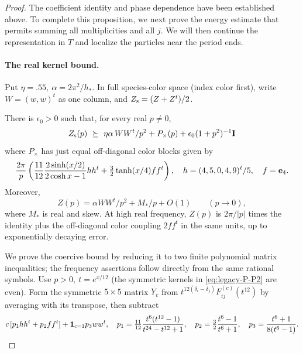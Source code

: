 \begin{proof}
The coefficient identity and phase dependence have been established
above. To complete this proposition, we next prove the energy estimate
that permits summing all multiplicities and all \(j\). We will then
continue the representation in \(T\) and localize the particles near
the period ends.

\paragraph{The real kernel bound.}
Put \(\eta=.55,\ \alpha=2\pi^2/h_*\). In full species-color space
(index color first), write \(W=(w,w)^t\) as one column, and
\(Z_{\rm s}=(Z+Z^t)/2\).

\begin{auxlemma}
There is \(\epsilon_0>0\) such that, for every real \(p\ne0\),
\begin{equation}
 Z_{\rm s}(p)\ \succeq\ \eta\alpha\, WW^t/p^2 + P_{\times}(p) + \epsilon_0(1+p^2)^{-1}{\bf I}
 \label{eq:legacy-P-P2}
\end{equation}
where \(P_{\times}\) has just equal off-diagonal color blocks given by
\[
 \frac{2\pi}{p}\left(\frac{11}{12}\frac{2\sinh(x/2)}{2\cosh x-1}hh^t
       +\tfrac32\tanh(x/4) f f^t\right),\quad
 h=(4,5,0,4,9)^t/5,\quad f={\bf e}_4 .
\]
Moreover,
\begin{equation}\label{eq:gas-kernel-zero}
 Z(p)=\alpha WW^t/p^2+M_*/p+O(1)\qquad(p\to0),
\end{equation}
where \(M_*\) is real and skew. At high real frequency, \(Z(p)\) is
\(2\pi/|p|\) times the identity plus the off-diagonal color coupling
\(2ff^t\) in the same units, up to exponentially decaying error.
\end{auxlemma}

We prove the coercive bound by reducing it to two finite polynomial
matrix inequalities; the frequency assertions follow directly from the
same rational symbols. Use \(p>0,\ t=e^{x/12}\) (the symmetric kernels
in \eqref{eq:legacy-P-P2} are even). Form the symmetric \(5\times5\)
matrix \(Y_c\) from
\(t^{12(\delta_i-\delta_j)}F^{(c)}_{ij}(t^{12})\) by averaging with
its transpose, then subtract
\[
 c\,[p_1hh^t+p_2ff^t]+{\bf1}_{c=1}p_3ww^t,
 \quad p_1=\tfrac{11}{12}\frac{t^6(t^{12}-1)}{t^{24}-t^{12}+1},
 \quad p_2=\tfrac32\frac{t^6-1}{t^6+1},\quad p_3=\frac{t^6+1}{8(t^6-1)} .
\]

\end{proof}
